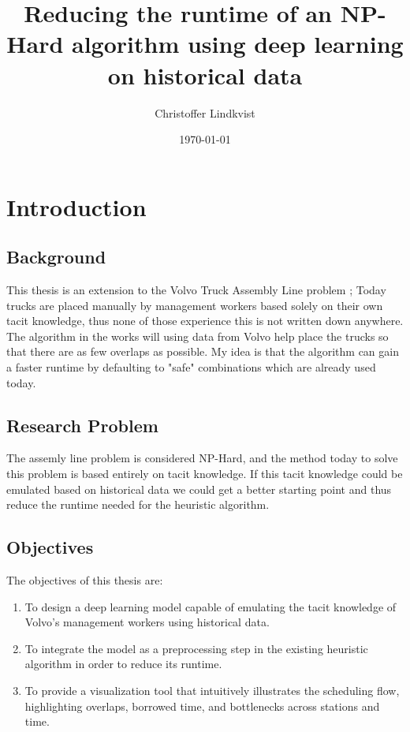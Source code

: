 \documentclass[12pt,a4paper]{report}
\begin{document}
\title{Reducing the runtime of an NP-Hard algorithm using deep learning on historical data}
\author{Christoffer Lindkvist}
\date{\today}
\maketitle

\begin{abstract}
\end{abstract}

\tableofcontents

\chapter{Introduction}
\section{Background}
    This thesis is an extension to the Volvo Truck Assembly Line problem \cite{?}; 
    Today trucks are placed manually by management workers based solely on their own tacit knowledge, 
    thus none of those experience this is not written down anywhere. 
    The algorithm in the works will using data from Volvo help place the trucks so that there are as few overlaps as possible. 
    My idea is that the algorithm can gain a faster runtime by defaulting to "safe" combinations which are already used today.
    
\section{Research Problem}
The assemly line problem is considered NP-Hard, and the method today to solve this problem is based entirely on tacit knowledge. If this tacit knowledge could be emulated based on historical data we could get a better starting point and thus reduce the runtime needed for the heuristic algorithm. 
\section{Objectives}
The objectives of this thesis are:
\begin{enumerate}
    \item To design a deep learning model capable of emulating the tacit knowledge of Volvo's management workers using historical data.
    \item To integrate the model as a preprocessing step in the existing heuristic algorithm in order to reduce its runtime.
    \item To provide a visualization tool that intuitively illustrates the scheduling flow, highlighting overlaps, borrowed time, and bottlenecks across stations and time.
\end{enumerate}
\end{document}
